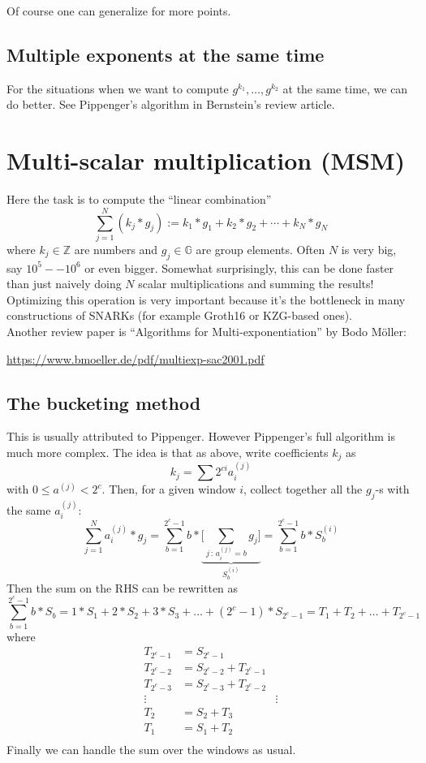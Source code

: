 \documentclass[12pt,draft,a4paper,openany,oneside]{amsbook}
\def\G{\mathbb{G}}
\def\Z{\mathbb{Z}}
\theoremstyle{plain}
\theoremstyle{definition}
\begin{document}
Of course one can generalize for more points.


\subsection{Multiple exponents at the same time}
For the situations when we want to compute $g^{k_1},\dots, g^{k_2}$ at the same
time, we can do better. See Pippenger's algorithm in Bernstein's review article. 


\section{Multi-scalar multiplication (MSM)}

Here the task is to compute the ``linear combination''
\[ \sum_{j=1}^N (k_j*g_j) := k_1 * g_1 + k_2 * g_2 + \cdots + k_N * g_N \]
where $k_j\in\Z$ are numbers and $g_j\in\G$ are group elements.
Often $N$ is very big, say $10^5--10^6$ or even bigger.
Somewhat surprisingly, this can be done faster than just naively doing $N$
scalar multiplications and summing the results!\\

Optimizing this operation is very important because it's the bottleneck
in many constructions of SNARKs (for example Groth16 or KZG-based ones).\\

Another review paper is ``Algorithms for Multi-exponentiation'' by Bodo M\"oller:

\noindent
\url{https://www.bmoeller.de/pdf/multiexp-sac2001.pdf}

\subsection{The bucketing method}
This is usually attributed to Pippenger. However Pippenger's full algorithm
is much more complex. 
The idea is that as above, write coefficients $k_j$ as
\[ k_j = \sum 2^{ci} a^{(j)}_i \]
with $0 \le a^{(j)} < 2^c$.
Then, for a given window $i$, collect together all the $g_j$-s with the same
$a^{(j)}_i$:
\[ \sum_{j=1}^N a^{(j)}_i * g_j = \sum_{b=1}^{2^c-1} b * 
\underbrace{ \bigg[\sum_{j\,:\,a^{(j)}_i=b} g_j \bigg]}_{S^{(i)}_b}  = \sum_{b=1}^{2^c-1} b * S^{(i)}_b
\]
Then the sum on the RHS can be rewritten as 
\[ \sum_{b=1}^{2^c-1} b * S_b = 1*S_1 + 2*S_2 + 3*S_3 + \dots + (2^c-1)*S_{2^c-1} =
T_1 + T_2 + \dots + T_{2^c-1} \]
where 
\begin{align*}
T_{2^c-1} &= S_{2^c-1}  \\
T_{2^c-2} &= S_{2^c-2} + T_{2^c-1}  \\
T_{2^c-3} &= S_{2^c-3} + T_{2^c-2}  \\
\vdots & & \vdots \\
T_{2} &= S_{2} + T_{3}  \\
T_{1} &= S_{1} + T_{2}  \\
\end{align*}
Finally we can handle the sum over the windows as usual.\\
\end{document}
